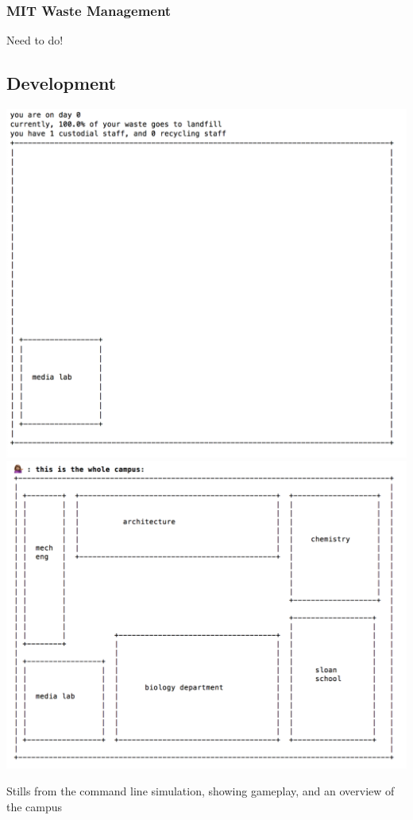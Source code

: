\documentclass[nofonts,nols,justified,nobib]{tufte-book}
\begin{document}
\subsubsection*{MIT Waste Management}
Need to do!


\subsection*{Development}

\begin{marginfigure}
\includegraphics[width=\textwidth]{img/3/prototyping/early-day.png}
\includegraphics[width=\textwidth]{img/3/prototyping/early-map.png}
\caption{Stills from the command line simulation, showing gameplay, and an overview of the campus  \label{b}}
\end{marginfigure}
\end{document}
